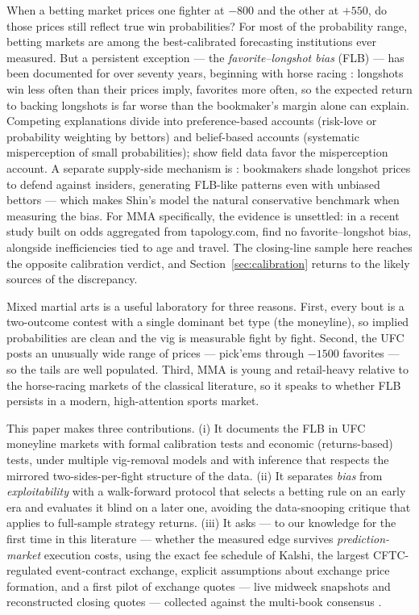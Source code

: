 \documentclass[11pt]{article}
\begin{document}
When a betting market prices one fighter at $-800$ and the other at $+550$, do those prices still
reflect true win probabilities? For most of the probability range, betting markets are among the
best-calibrated forecasting institutions ever measured. But a persistent exception --- the
\emph{favorite--longshot bias} (FLB) --- has been documented for over seventy years, beginning with
horse racing \citep{griffith1949, ali1977, thaler1988}: longshots win less often than their prices
imply, favorites more often, so the expected return to backing longshots is far worse than the
bookmaker's margin alone can explain. Competing explanations divide into preference-based accounts
(risk-love or probability weighting by bettors) and belief-based accounts (systematic
misperception of small probabilities); \citet{snowberg2010} show field data favor the
misperception account. A separate supply-side mechanism is \citet{shin1993}: bookmakers shade
longshot prices to defend against insiders, generating FLB-like patterns even with unbiased
bettors --- which makes Shin's model the natural conservative benchmark when measuring the bias.
For MMA specifically, the evidence is unsettled: in a recent study built on odds aggregated from
tapology.com, \citet{miller2026} find no favorite--longshot bias, alongside inefficiencies tied to
age and travel. The closing-line sample here reaches the opposite calibration verdict, and
Section~\ref{sec:calibration} returns to the likely sources of the discrepancy.

Mixed martial arts is a useful laboratory for three reasons. First, every bout is a two-outcome
contest with a single dominant bet type (the moneyline), so implied probabilities are clean and the
vig is measurable fight by fight. Second, the UFC posts an unusually wide range of prices ---
pick'ems through $-1500$ favorites --- so the tails are well populated. Third, MMA is young and
retail-heavy relative to the horse-racing markets of the classical literature, so it speaks to
whether FLB persists in a modern, high-attention sports market.

This paper makes three contributions. (i) It documents the FLB in UFC moneyline markets with
formal calibration tests and economic (returns-based) tests, under multiple vig-removal models and
with inference that respects the mirrored two-sides-per-fight structure of the data. (ii) It
separates \emph{bias} from \emph{exploitability} with a walk-forward protocol that selects a
betting rule on an early era and evaluates it blind on a later one, avoiding the data-snooping
critique that applies to full-sample strategy returns. (iii) It asks --- to our knowledge for the
first time in this literature --- whether the measured edge survives \emph{prediction-market}
execution costs, using the exact fee schedule of Kalshi, the largest CFTC-regulated event-contract
exchange, explicit assumptions about exchange price formation, and a first pilot of exchange
quotes --- live midweek snapshots and reconstructed closing quotes --- collected against the
multi-book consensus \citep{wolfers2004, kalshifees}.
\end{document}
